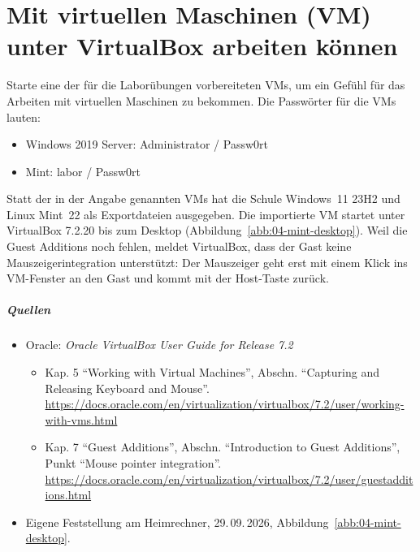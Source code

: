 \chapter{Mit virtuellen Maschinen (VM) unter VirtualBox arbeiten können}
\label{kap:arbeiten}

\begin{aufgabe}
Starte eine der für die Laborübungen vorbereiteten VMs, um ein Gefühl für das Arbeiten mit virtuellen Maschinen zu bekommen. Die Passwörter für die VMs lauten:
\begin{itemize}[nosep]
  \item Windows 2019 Server: Administrator / Passw0rt
  \item Mint: labor / Passw0rt
\end{itemize}
\end{aufgabe}

Statt der in der Angabe genannten VMs hat die Schule Windows~11 23H2 und Linux Mint~22 als Exportdateien ausgegeben. Die importierte VM  startet unter VirtualBox 7.2.20 bis zum Desktop (Abbildung~\ref{abb:04-mint-desktop}). Weil die Guest Additions noch fehlen, meldet VirtualBox, dass der Gast keine Mauszeigerintegration unterstützt: Der Mauszeiger geht erst mit einem Klick ins VM-Fenster an den Gast und kommt mit der Host-Taste zurück.


\paragraph{Quellen}
\begin{itemize}[quellen]
  \item Oracle: \emph{Oracle VirtualBox User Guide for Release 7.2}
  \begin{itemize}[nosep]
    \item Kap. 5 \enquote{Working with Virtual Machines}, Abschn. \enquote{Capturing and Releasing Keyboard and Mouse}. \url{https://docs.oracle.com/en/virtualization/virtualbox/7.2/user/working-with-vms.html}
    \item Kap. 7 \enquote{Guest Additions}, Abschn. \enquote{Introduction to Guest Additions}, Punkt \enquote{Mouse pointer integration}. \url{https://docs.oracle.com/en/virtualization/virtualbox/7.2/user/guestadditions.html}
  \end{itemize}
  \item Eigene Feststellung am Heimrechner, 29.\,09.\,2026, Abbildung~\ref{abb:04-mint-desktop}.
\end{itemize}

